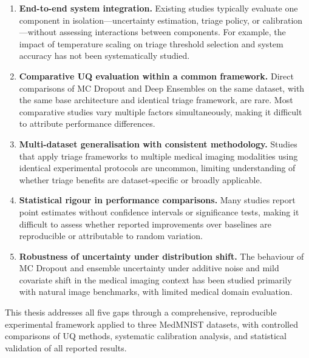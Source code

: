 \begin{enumerate}
    \item \textbf{End-to-end system integration.} Existing studies typically evaluate one component in isolation—uncertainty estimation, triage policy, or calibration—without assessing interactions between components. For example, the impact of temperature scaling on triage threshold selection and system accuracy has not been systematically studied.

    \item \textbf{Comparative UQ evaluation within a common framework.} Direct comparisons of MC Dropout and Deep Ensembles on the same dataset, with the same base architecture and identical triage framework, are rare. Most comparative studies vary multiple factors simultaneously, making it difficult to attribute performance differences.

    \item \textbf{Multi-dataset generalisation with consistent methodology.} Studies that apply triage frameworks to multiple medical imaging modalities using identical experimental protocols are uncommon, limiting understanding of whether triage benefits are dataset-specific or broadly applicable.

    \item \textbf{Statistical rigour in performance comparisons.} Many studies report point estimates without confidence intervals or significance tests, making it difficult to assess whether reported improvements over baselines are reproducible or attributable to random variation.

    \item \textbf{Robustness of uncertainty under distribution shift.} The behaviour of MC Dropout and ensemble uncertainty under additive noise and mild covariate shift in the medical imaging context has been studied primarily with natural image benchmarks, with limited medical domain evaluation.
\end{enumerate}

This thesis addresses all five gaps through a comprehensive, reproducible experimental framework applied to three MedMNIST datasets, with controlled comparisons of UQ methods, systematic calibration analysis, and statistical validation of all reported results.